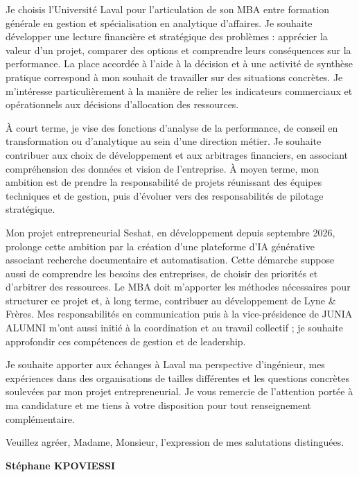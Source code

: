 \documentclass[12pt,a4paper]{article}
\begin{document}
Je choisis l'Université Laval pour l'articulation de son MBA entre formation générale en gestion et spécialisation en analytique d'affaires. Je souhaite développer une lecture financière et stratégique des problèmes : apprécier la valeur d'un projet, comparer des options et comprendre leurs conséquences sur la performance. La place accordée à l'aide à la décision et à une activité de synthèse pratique correspond à mon souhait de travailler sur des situations concrètes. Je m'intéresse particulièrement à la manière de relier les indicateurs commerciaux et opérationnels aux décisions d'allocation des ressources.

À court terme, je vise des fonctions d'analyse de la performance, de conseil en transformation ou d'analytique au sein d'une direction métier. Je souhaite contribuer aux choix de développement et aux arbitrages financiers, en associant compréhension des données et vision de l'entreprise. À moyen terme, mon ambition est de prendre la responsabilité de projets réunissant des équipes techniques et de gestion, puis d'évoluer vers des responsabilités de pilotage stratégique.

Mon projet entrepreneurial Seshat, en développement depuis septembre 2026, prolonge cette ambition par la création d'une plateforme d'IA générative associant recherche documentaire et automatisation. Cette démarche suppose aussi de comprendre les besoins des entreprises, de choisir des priorités et d'arbitrer des ressources. Le MBA doit m'apporter les méthodes nécessaires pour structurer ce projet et, à long terme, contribuer au développement de Lyne \& Frères. Mes responsabilités en communication puis à la vice-présidence de JUNIA ALUMNI m'ont aussi initié à la coordination et au travail collectif ; je souhaite approfondir ces compétences de gestion et de leadership.

Je souhaite apporter aux échanges à Laval ma perspective d'ingénieur, mes expériences dans des organisations de tailles différentes et les questions concrètes soulevées par mon projet entrepreneurial. Je vous remercie de l'attention portée à ma candidature et me tiens à votre disposition pour tout renseignement complémentaire.

Veuillez agréer, Madame, Monsieur, l'expression de mes salutations distinguées.

\vspace{0.5em}
\textbf{Stéphane KPOVIESSI}
\end{document}
